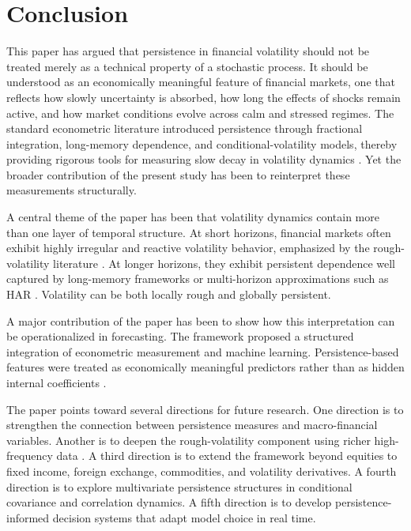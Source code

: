 \documentclass[12pt]{article}
\begin{document}
\section{Conclusion}
\label{sec:conclusion}

This paper has argued that persistence in financial volatility should not be treated merely as a technical property of a stochastic process. It should be understood as an economically meaningful feature of financial markets, one that reflects how slowly uncertainty is absorbed, how long the effects of shocks remain active, and how market conditions evolve across calm and stressed regimes. The standard econometric literature introduced persistence through fractional integration, long-memory dependence, and conditional-volatility models, thereby providing rigorous tools for measuring slow decay in volatility dynamics \citep{GrangerJoyeux1980, Hosking1981, Baillie1996}. Yet the broader contribution of the present study has been to reinterpret these measurements structurally.

A central theme of the paper has been that volatility dynamics contain more than one layer of temporal structure. At short horizons, financial markets often exhibit highly irregular and reactive volatility behavior, emphasized by the rough-volatility literature \citep{Gatheral2018}. At longer horizons, they exhibit persistent dependence well captured by long-memory frameworks or multi-horizon approximations such as HAR \citep{Andersen2003, Corsi2009}. Volatility can be both locally rough and globally persistent.

A major contribution of the paper has been to show how this interpretation can be operationalized in forecasting. The framework proposed a structured integration of econometric measurement and machine learning. Persistence-based features were treated as economically meaningful predictors rather than as hidden internal coefficients \citep{Hastie2009, Breiman2001, Friedman2001}.

The paper points toward several directions for future research. One direction is to strengthen the connection between persistence measures and macro-financial variables. Another is to deepen the rough-volatility component using richer high-frequency data \citep{Bennedsen2021}. A third direction is to extend the framework beyond equities to fixed income, foreign exchange, commodities, and volatility derivatives. A fourth direction is to explore multivariate persistence structures in conditional covariance and correlation dynamics. A fifth direction is to develop persistence-informed decision systems that adapt model choice in real time.
\end{document}
